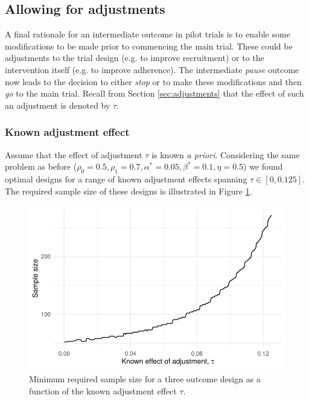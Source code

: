 \documentclass{bmcart}
\begin{document}
\subsection{Allowing for adjustments}


A final rationale for an intermediate outcome in pilot trials is to enable some modifications to be made prior to commencing the main trial. These could be adjustments to the trial design (e.g. to improve recruitment) or to the intervention itself (e.g. to improve adherence). The intermediate \emph{pause} outcome now leads to the decision to either \emph{stop} or to make these modifications and then \emph{go} to the main trial. Recall from Section \ref{sec:adjustments} that the effect of such an adjustment is denoted by $\tau$.

\subsubsection{Known adjustment effect}

Assume that the effect of adjustment $\tau$ is known \emph{a priori}. Considering the same problem as before ($\rho_0 = 0.5, \rho_1 = 0.7, \alpha^* = 0.05, \beta^* = 0.1, \eta = 0.5$) we found optimal designs for a range of known adjustment effects spanning $\tau \in [0, 0.125]$. The required sample size of these designs is illustrated in Figure \ref{fig:tau_ns}. 

\begin{figure}
\centering
\includegraphics[scale=0.8]{./figures/tau_ns}
\caption{Minimum required sample size for a three outcome design as a function of the known adjustment effect $\tau$.}
\label{fig:tau_ns}
\end{figure}
\end{document}
